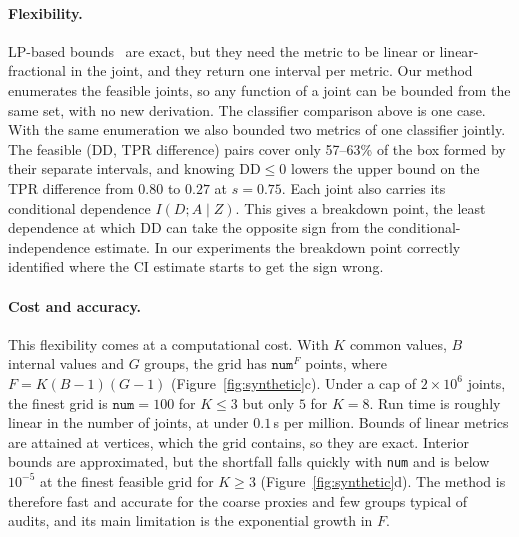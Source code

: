\paragraph{Flexibility.}
LP-based bounds~\citep{TODO-kallus} are exact, but they need the metric to be linear or
linear-fractional in the joint, and they return one interval per metric. Our method enumerates
the feasible joints, so any function of a joint can be bounded from the same set, with no new
derivation. The classifier comparison above is one case. With the same enumeration we also
bounded two metrics of one classifier jointly. The feasible (DD, TPR difference) pairs cover
only 57--63\% of the box formed by their separate intervals, and knowing $\mathrm{DD} \le 0$
lowers the upper bound on the TPR difference from $0.80$ to $0.27$ at $s = 0.75$. Each joint
also carries its conditional dependence $I(D; A \mid Z)$. This gives a breakdown point, the
least dependence at which DD can take the opposite sign from the conditional-independence
estimate. In our experiments the breakdown point correctly identified where the CI estimate
starts to get the sign wrong.

\paragraph{Cost and accuracy.}
This flexibility comes at a computational cost. With $K$ common values, $B$ internal values and
$G$ groups, the grid has $\texttt{num}^F$ points, where $F = K(B-1)(G-1)$
(Figure~\ref{fig:synthetic}c). Under a cap of $2 \times 10^6$ joints, the finest grid is
$\texttt{num} = 100$ for $K \le 3$ but only $5$ for $K = 8$. Run time is roughly linear in the
number of joints, at under $0.1$\,s per million. Bounds of linear metrics are attained at
vertices, which the grid contains, so they are exact. Interior bounds are approximated, but the
shortfall falls quickly with \texttt{num} and is below $10^{-5}$ at the finest feasible grid for
$K \ge 3$ (Figure~\ref{fig:synthetic}d). The method is therefore fast and accurate for the
coarse proxies and few groups typical of audits, and its main limitation is the exponential
growth in $F$.
